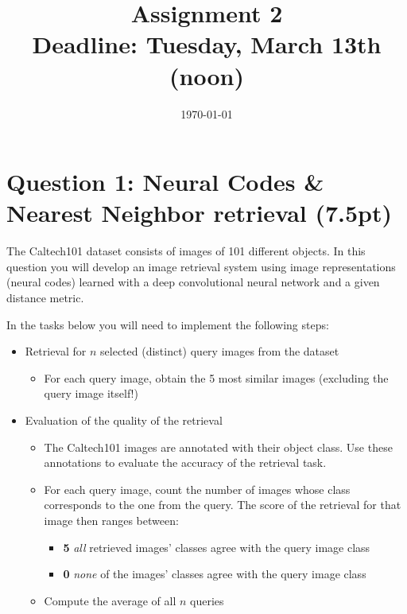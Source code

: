 \documentclass[a4paper,twoside,10pt]{article}
\title{\vspace{-\baselineskip}\sffamily\bfseries Assignment 2 \\
\large Deadline: Tuesday, March 13th (noon)}
\date{\today}
\begin{document}
\maketitle

\section*{Question 1: Neural Codes \& Nearest Neighbor retrieval (7.5pt)}
The Caltech101 dataset consists of images of 101 different objects. In this question you will develop an image retrieval system using image representations (neural codes) learned with a deep convolutional neural network and a given distance metric.

In the tasks below you will need to implement the following steps:
\begin{itemize}
  \item Retrieval for  $n$  selected (distinct) query images from the dataset
  \begin{itemize}
    \item For each query image, obtain the 5 most similar images (excluding the query image itself!)
  \end{itemize}
  
  \item Evaluation of the quality of the retrieval
  \begin{itemize}
    \item The Caltech101 images are annotated with their object class. Use these annotations to evaluate the accuracy of the retrieval task.
    \item For each query image, count the number of images whose class corresponds to the one from the query. The score of the retrieval for that image then ranges between:
    \begin{itemize}
      \item \textbf{5} \emph{all} retrieved images' classes agree with the query image class
	  \item \textbf{0} \emph{none} of the images' classes agree with the query image class
    \end{itemize}
    \item Compute the average of all $n$ queries
  \end{itemize}
\end{itemize}
\end{document}
